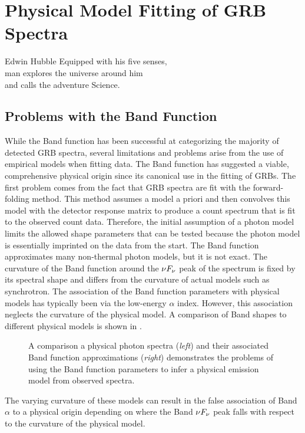 \chapter{Physical Model Fitting of GRB Spectra}
\label{ch:phys}
\begin{chapterquote}{Edwin Hubble}
  Equipped with his five senses,\\ man explores the universe around him\\
  and calls the adventure Science.
\end{chapterquote}
\section{Problems with the Band Function}
While the Band function has been successful at categorizing the
majority of detected GRB spectra, several limitations and problems
arise from the use of empirical models when fitting data. The Band
function has suggested a viable, comprehensive physical origin since its
canonical use in the fitting of GRBs. The first problem comes from the
fact that GRB spectra are fit with the forward-folding method. This
method assumes a model a priori and then convolves this model with the
detector response matrix to produce a count spectrum that is fit to the observed count
data. Therefore, the initial assumption of a photon model limits the
allowed shape parameters that can be tested because the photon model
is essentially imprinted on the data from the start. The Band function
approximates many non-thermal photon models, but it is not exact. The
curvature of the Band function around the $\nu F_{\nu}$ peak of the spectrum
is fixed by its spectral shape and differs from the curvature of
actual models such as synchrotron. The association of the Band
function parameters with physical models has typically been via the
low-energy $\alpha$ index. However, this association neglects the
curvature of the physical model. A comparison of Band shapes to
different physical models is shown in .
\begin{figure}[h]
  \centering
  \caption{A comparison a physical photon spectra (\emph{left}) and
    their associated Band function approximations (\emph{right})
    demonstrates the problems of using the Band function parameters to
    infer a physical emission model from observed spectra.}
  \label{fig:bandCompPhys}
\end{figure}
The varying curvature of these models
can result in the false association of Band $\alpha$ to a physical
origin depending on where the Band $\nu F_{\nu}$ peak falls with respect to
the curvature of the physical model. 

